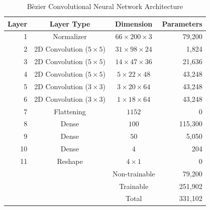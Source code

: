\documentclass[conference]{IEEEtran}
\begin{document}
\begin{table}[tbp]
	\centering
	\caption{B\`ezier Convolutional Neural Network Architecture}
	\begin{tabular}{|r|c|c|r|}
	\multicolumn{1}{c}{\bfseries Layer} & \multicolumn{1}{c}{\bfseries Layer Type} & \multicolumn{1}{c}{\bfseries Dimension} & \multicolumn{1}{c}{\bfseries Parameters} \\ \hline
	1 & Normalizer & $66 \times 200 \times 3$ & 79,200 \\
	2 & 2D Convolution ($5\times5$)& $31 \times 98 \times 24$ & 1,824 \\
	3 & 2D Convolution ($5\times5$)& $14 \times 47 \times 36$ & 21,636 \\
	4 & 2D Convolution ($5\times5$)& $5 \times 22 \times 48$ & 43,248 \\
	5 & 2D Convolution ($3\times3$)& $3 \times 20 \times 64$ & 43,248 \\
	6 & 2D Convolution ($3\times3$)& $1 \times 18 \times 64$ & 43,248 \\
	7 & Flattening & $1152$ & 0 \\
	8 & Dense & $100$ & 115,300 \\
	9 & Dense & $50$ & 5,050 \\
	10 & Dense & $4$ & 204 \\
	11 & Reshape & $4\times 1$ & 0 \\ \hline
	\multicolumn{2}{c|}{} & Non-trainable & 79,200 \\
	\multicolumn{2}{c|}{} & Trainable & 251,902 \\ \cline{3-4}
	\multicolumn{2}{c|}{} & Total & 331,102 \\ \cline{3-4}
	\end{tabular}
	\label{tab:i2c-arch}
\end{table}
\end{document}
